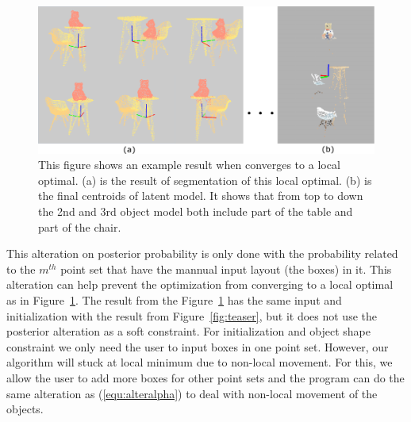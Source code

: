 \begin{figure}[htb]
	\centering
	\includegraphics[width=\linewidth]{images/localoptimal/localoptimal}
	\caption{\label{fig:localoptimal}This figure shows an example result when converges to a local optimal. (a) is the result of segmentation of this local optimal. (b) is the final centroids of latent model. It shows that from top to down the 2nd and 3rd object model both include part of the table and part of the chair.}
\end{figure}
This alteration on posterior probability is only done with the probability related to the $m^{th}$ point set that have the mannual input layout (the boxes) in it. This alteration can help prevent the optimization from converging to a local optimal as in Figure~\ref{fig:localoptimal}. The result from the Figure~\ref{fig:localoptimal} has the same input and initialization with the result from Figure~\ref{fig:teaser}, but it does not use the posterior alteration as a soft constraint.
%
For initialization and object shape constraint we only need the user to input boxes in one point set. However, our algorithm will stuck at local minimum due to non-local movement. For this, we allow the user to add more boxes for other point sets and the program can do the same alteration as (\ref{equ:alteralpha}) to deal with non-local movement of the objects.
%
%
